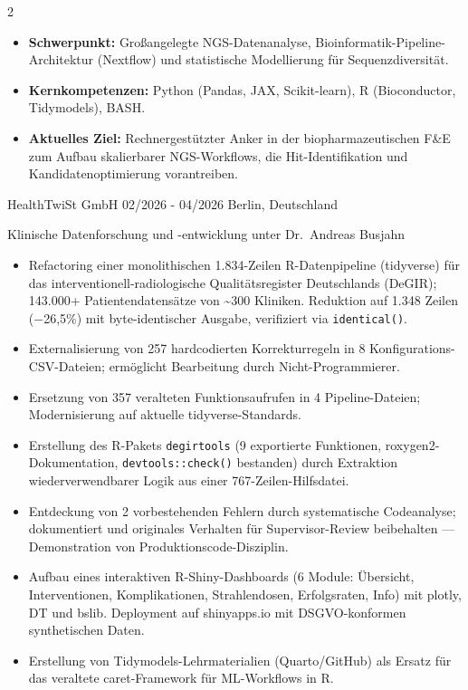 \documentclass{thejus_cv}
\begin{document}
\begin{paracol}{2}


\begin{itemize}[label=\textbullet, leftmargin=1em]
    \item \textbf{Schwerpunkt:} Gro{\ss}angelegte NGS-Datenanalyse, Bioinformatik-Pipeline-Architektur (Nextflow) und statistische Modellierung f\"ur Sequenzdiversit\"at.
    \item \textbf{Kernkompetenzen:} Python (Pandas, JAX, Scikit-learn), R (Bioconductor, Tidymodels), BASH.
    \item \textbf{Aktuelles Ziel:} Rechnergest\"utzter Anker in der biopharmazeutischen F\&E zum Aufbau skalierbarer NGS-Workflows, die Hit-Identifikation und Kandidatenoptimierung vorantreiben.
\end{itemize}


             {HealthTwiSt GmbH}
             {02/2026 - 04/2026}
             {Berlin, Deutschland}
             {Klinische Datenforschung und -entwicklung unter Dr.~Andreas Busjahn
             \begin{itemize}
                   \item Refactoring einer monolithischen 1.834-Zeilen R-Datenpipeline (tidyverse) f\"ur das interventionell-radiologische Qualit\"atsregister Deutschlands (DeGIR); 143.000+ Patientendatens\"atze von \textasciitilde300 Kliniken. Reduktion auf 1.348 Zeilen ($-$26,5\%) mit byte-identischer Ausgabe, verifiziert via \texttt{identical()}.
                   \item Externalisierung von 257 hardcodierten Korrekturregeln in 8 Konfigurations-CSV-Dateien; erm\"oglicht Bearbeitung durch Nicht-Programmierer.
                   \item Ersetzung von 357 veralteten Funktionsaufrufen in 4 Pipeline-Dateien; Modernisierung auf aktuelle tidyverse-Standards.
                   \item Erstellung des R-Pakets \texttt{degirtools} (9 exportierte Funktionen, roxygen2-Dokumentation, \texttt{devtools::check()} bestanden) durch Extraktion wiederverwendbarer Logik aus einer 767-Zeilen-Hilfsdatei.
                   \item Entdeckung von 2 vorbestehenden Fehlern durch systematische Codeanalyse; dokumentiert und originales Verhalten f\"ur Supervisor-Review beibehalten --- Demonstration von Produktionscode-Disziplin.
                   \item Aufbau eines interaktiven R-Shiny-Dashboards (6 Module: \"Ubersicht, Interventionen, Komplikationen, Strahlendosen, Erfolgsraten, Info) mit plotly, DT und bslib. Deployment auf shinyapps.io mit DSGVO-konformen synthetischen Daten.
                   \item Erstellung von Tidymodels-Lehrmaterialien (Quarto/GitHub) als Ersatz f\"ur das veraltete caret-Framework f\"ur ML-Workflows in R.
               \end{itemize}}


\end{paracol}
\end{document}
